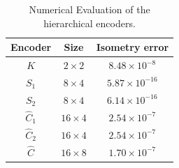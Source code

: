 \documentclass[conference]{IEEEtran}
\begin{document}
\begin{table}[t]
\centering
\caption{Numerical Evaluation of the hierarchical encoders.}
\label{numerical_validation table}
\begin{tabular}{c c c}
\hline
Encoder & Size & Isometry error \\
\hline
$K$& $2\times 2$& $8.48 \times 10^{-8}$\\
$S_1$ & $8\times 4$ & $5.87\times 10^{-16}$  \\
$S_2$& $8\times 4$ & $6.14\times 10^{-16}$  \\
$\widehat{C}_1$& $16\times 4$&$2.54 \times10^{-7}$\\
$\widehat{C}_2$& $16\times 4$& $2.54 \times10^{-7}$\\
$\widehat{C}$& $16\times 8$& $1.70\times10^{-7}$\\
\hline
\end{tabular}
\end{table}


\end{document}
